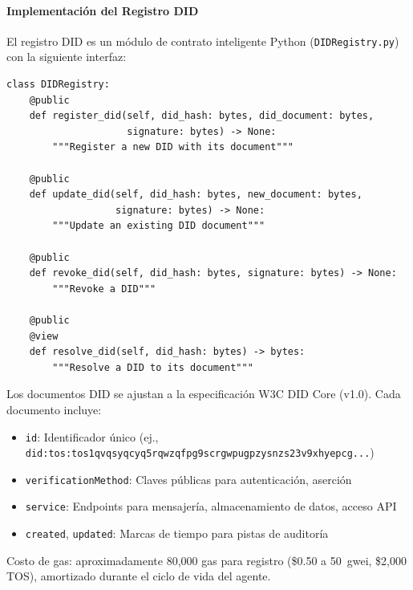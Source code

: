 \documentclass[11pt]{article}
\begin{document}
\paragraph{Implementación del Registro DID} El registro DID es un módulo de contrato inteligente Python (\texttt{DIDRegistry.py}) con la siguiente interfaz:
\begin{verbatim}
class DIDRegistry:
    @public
    def register_did(self, did_hash: bytes, did_document: bytes,
                     signature: bytes) -> None:
        """Register a new DID with its document"""

    @public
    def update_did(self, did_hash: bytes, new_document: bytes,
                   signature: bytes) -> None:
        """Update an existing DID document"""

    @public
    def revoke_did(self, did_hash: bytes, signature: bytes) -> None:
        """Revoke a DID"""

    @public
    @view
    def resolve_did(self, did_hash: bytes) -> bytes:
        """Resolve a DID to its document"""
\end{verbatim}
Los documentos DID se ajustan a la especificación W3C DID Core (v1.0). Cada documento incluye:
\begin{itemize}[noitemsep]
  \item \texttt{id}: Identificador único (ej., \texttt{did:tos:tos1qvqsyqcyq5rqwzqfpg9scrgwpugpzysnzs23v9xhyepcg...})
  \item \texttt{verificationMethod}: Claves públicas para autenticación, aserción
  \item \texttt{service}: Endpoints para mensajería, almacenamiento de datos, acceso API
  \item \texttt{created}, \texttt{updated}: Marcas de tiempo para pistas de auditoría
\end{itemize}
Costo de gas: aproximadamente 80,000 gas para registro (\$0.50 a 50~gwei, \$2,000 TOS), amortizado durante el ciclo de vida del agente.
\end{document}
